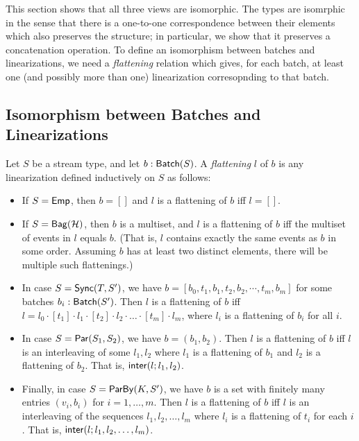 This section shows that all three views are isomorphic.
The types are isomrphic in the sense that there is a one-to-one correspondence between their elements which also preserves the structure; in particular, we show that it preserves a concatenation operation.
To define an isomorphism between batches and linearizations,
we need a \emph{flattening} relation which gives, for each batch, at least one (and possibly more than one) linearization corresopnding to that batch.

\subsection{Isomorphism between Batches and Linearizations}

\begin{definition}[Flattening]
    \label{def:batch-flattening}
    Let $S$ be a stream type,
    and let $b: \mathsf{Batch}({S})$.
    A \emph{flattening} $l$ of $b$ is any linearization
    defined inductively on $S$ as follows:
\begin{itemize}
\item If $S = \mathsf{Emp}{}$, then $b = []$ and $l$ is a flattening of $b$ iff $l = []$.
\item If $S = \mathsf{Bag}({\mathcal{H}})$, then $b$ is a multiset, and $l$ is a flattening of $b$ iff the multiset of events in $l$ equals $b$.
(That is, $l$ contains exactly the same events as $b$ in some order. Assuming $b$ has at least two distinct elements, there will be multiple such flattenings.)
\item In case $S = \mathsf{Sync}({T}, S')$, we have $b = [b_0, t_1, b_1, t_2, b_2, \cdots, t_m, b_m]$ for some batches $b_i: \mathsf{Batch}({S'})$.
Then $l$ is a flattening of $b$ iff $l = l_0 \cdot [t_1] \cdot l_1 \cdot [t_2] \cdot l_2 \cdot \ldots \cdot [t_m] \cdot l_m$,
where $l_i$ is a flattening of $b_i$ for all $i$.
\item In case $S = \mathsf{Par}({S_1}, {S_2})$, we have $b = (b_1, b_2)$.
Then $l$ is a flattening of $b$ iff $l$ is an interleaving of some $l_1, l_2$ where $l_1$ is a flattening of $b_1$ and $l_2$ is a flattening of $b_2$.
That is, $\mathsf{inter}(l; l_1, l_2)$.
\item Finally, in case $S = \mathsf{ParBy}({K}, S')$, we have $b$ is a set with finitely many entries $(v_i, b_i)$ for $i = 1, \ldots, m$.
Then $l$ is a flattening of $b$ iff $l$ is an interleaving of the sequences $l_1, l_2, \ldots, l_m$
where $l_i$ is a flattening of $t_i$ for each $i$.
That is, $\mathsf{inter}(l; l_1, l_2, \ldots, l_m)$.
\end{itemize}
\end{definition}

